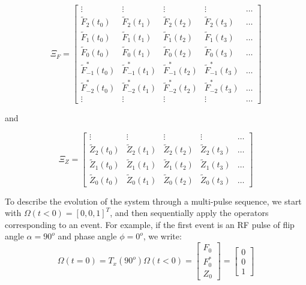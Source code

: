 \begin{equation}
    \Xi_F = 
    \begin{bmatrix}
    \vdots & \vdots & \vdots & \vdots & \dots \\
    \widetilde{F}_2(t_0) & \widetilde{F}_2(t_1) & \widetilde{F}_2(t_2) & \widetilde{F}_2(t_3) & \dots \\
    \widetilde{F}_1(t_0) & \widetilde{F}_1(t_1) & \widetilde{F}_1(t_2) & \widetilde{F}_1(t_3) & \dots \\
    \widetilde{F}_0(t_0) & \widetilde{F}_0(t_1) & \widetilde{F}_0(t_2) & \widetilde{F}_0(t_3) & \dots \\
    \widetilde{F}^*_{-1}(t_0) & \widetilde{F}^*_{-1}(t_1) & \widetilde{F}^*_{-1}(t_2) & \widetilde{F}^*_{-1}(t_3) & \dots \\
    \widetilde{F}^*_{-2}(t_0) & \widetilde{F}^*_{-2}(t_1) & \widetilde{F}^*_{-2}(t_2) & \widetilde{F}^*_{-2}(t_3) & \dots \\
    \vdots & \vdots & \vdots & \vdots & \dots 
    \end{bmatrix}
\end{equation}

and

\begin{equation}
    \Xi_Z = 
    \begin{bmatrix}
    \vdots & \vdots & \vdots & \vdots & \dots \\
    \widetilde{Z}_2(t_0) & \widetilde{Z}_2(t_1) & \widetilde{Z}_2(t_2) & \widetilde{Z}_2(t_3) & \dots \\
    \widetilde{Z}_1(t_0) & \widetilde{Z}_1(t_1) & \widetilde{Z}_1(t_2) & \widetilde{Z}_1(t_3) & \dots \\
    \widetilde{Z}_0(t_0) & \widetilde{Z}_0(t_1) & \widetilde{Z}_0(t_2) & \widetilde{Z}_0(t_3) & \dots 
    \end{bmatrix}
\end{equation}

\hfill

To describe the evolution of the system through a multi-pulse sequence, we start with $\Omega (t < 0) = [0, 0, 1]^T$, and then sequentially apply the operators corresponding to an event.
For example, if the first event is an RF pulse of flip angle $\alpha = 90^o$ and phase angle $\phi = 0^o$, we write:
\begin{equation}
    \Omega (t = 0) = T_x(90^o) \Omega (t < 0) = 
    \begin{bmatrix} 
        F_0 \\
        F^*_0 \\
        Z_0
    \end{bmatrix} = 
    \begin{bmatrix} 
        0 \\
        0 \\
        1
    \end{bmatrix}
\end{equation}

